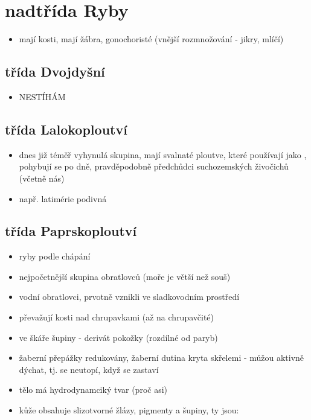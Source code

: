 \documentclass{article}
\begin{document}
\section{nadtřída Ryby}
\begin{itemize}
  \item mají kosti, mají žábra, gonochoristé (vnější rozmnožování - jikry, mlíčí)
\end{itemize}

\subsection{třída Dvojdyšní}%
\begin{itemize}
  \item NESTÍHÁM
\end{itemize}

\subsection{třída Lalokoploutví}
\begin{itemize}
  \item dnes již téměř vyhynulá skupina, mají svalnaté ploutve, které používají jako , pohybují se po dně, pravděpodobně předchůdci suchozemských živočichů (včetně nás)
  \item např. latimérie podivná
\end{itemize}

\subsection{třída Paprskoploutví}
\begin{itemize}
  \item ryby podle  chápání
  \item nejpočetnější skupina obratlovců (moře je větší než souš)
  \item vodní obratlovci, prvotně vznikli ve sladkovodním prostředí
  \item převažují kosti nad chrupavkami (až na chrupavčité)
  \item ve škáře šupiny - derivát pokožky (rozdílné od paryb)
  \item žaberní přepážky redukovány, žaberní dutina kryta skřelemi - můžou aktivně dýchat, tj. se neutopí, když se zastaví
  \item tělo má hydrodynamciký tvar (proč asi)
  \item kůže obsahuje slizotvorné žlázy, pigmenty a šupiny, ty jsou:
\end{itemize}
\end{document}
